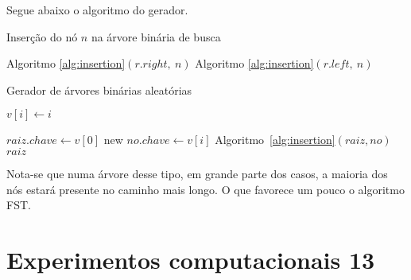 \documentclass[a4paper,12pt]{article}
\begin{document}
	Segue abaixo o algoritmo do gerador.
	\bigskip
	\bigskip

	\begin{algorithm}[H]
	\label{alg:insertion}

		\caption{Inserção do nó $n$ na árvore binária de busca}
		\Output{}
		{
			{
				Algoritmo \ref{alg:insertion}$(r.right,~n)$\;
			}
		}
		{
			{
				Algoritmo \ref{alg:insertion}$(r.left, ~n)$\;
			}
		}

	\end{algorithm}	

	\bigskip

	\begin{algorithm}[H]
	\label{alg:ABAgenerator}

		\caption{Gerador de árvores binárias aleatórias}
		\bigskip
		{
			$v[i] \gets i$\;
		}

		\bigskip
		$raiz.chave\gets v[0]$\;
		{
			new $no.chave\gets v[i]$\;
			Algoritmo~\ref{alg:insertion}$(raiz, no)$\;
		}
		\Return $raiz$\;

	\end{algorithm}	

	\bigskip
	\bigskip

	Nota-se que numa árvore desse tipo, em grande parte dos casos,  
	a maioria dos nós estará presente no caminho mais longo. 
	O que favorece um pouco o algoritmo FST.


\newpage
\section {Experimentos computacionais 13}
\end{document}

